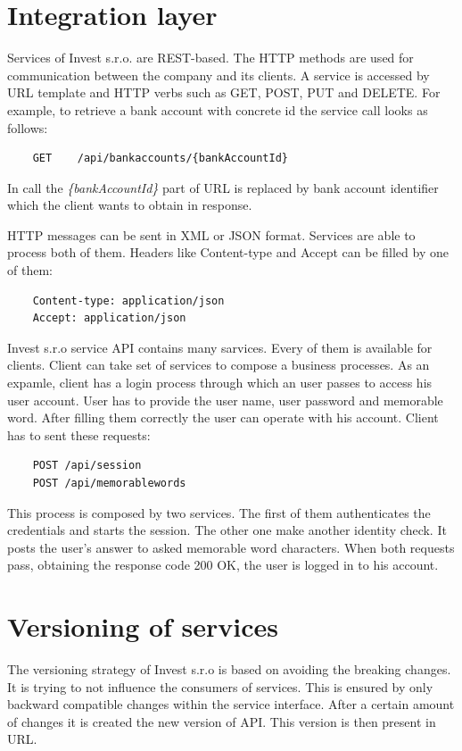 \section{Integration layer}
Services of Invest s.r.o. are REST-based. The HTTP methods are used for communication between the company and its clients. A service is accessed by URL template and HTTP verbs such as GET, POST, PUT and DELETE. For example, to retrieve a bank account with concrete id the service call looks as follows: 

\begin{lstlisting}
    GET    /api/bankaccounts/{bankAccountId}
\end{lstlisting}

In call the \emph{\{bankAccountId\}} part of URL is replaced by bank account identifier which the client wants to obtain in response.

HTTP messages can be sent in XML or JSON format. Services are able to process both of them. Headers like Content-type and Accept can be filled by one of them:
 
\begin{lstlisting}
    Content-type: application/json
    Accept: application/json
\end{lstlisting}

Invest s.r.o service API contains many sarvices. Every of them is available for clients. Client can take set of services to compose a business processes. As an expamle, client has a login process through which an user passes to access his user account. User has to provide the user name, user password and memorable word. After filling them correctly the user can operate with his account. Client has to sent these requests:

\begin{lstlisting}
    POST /api/session
    POST /api/memorablewords
\end{lstlisting}
  
This process is composed by two services. The first of them authenticates the credentials and starts the session. The other one make another identity check. It posts the user's answer to asked memorable word characters. When both requests pass, obtaining the response code 200 OK, the user is logged in to his account.

\section{Versioning of services}
The versioning strategy of Invest s.r.o is based on avoiding the breaking changes. It is trying to not influence the consumers of services. This is ensured by only backward compatible changes within the service interface. After a certain amount of changes it is created the new version of API. This version is then present in URL. 

